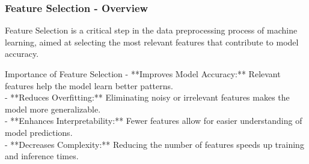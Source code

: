 \documentclass[aspectratio=169]{beamer}
\begin{document}
\begin{frame}[fragile]
    \frametitle{Feature Selection - Overview}
    Feature Selection is a critical step in the data preprocessing process of machine learning, aimed at selecting the most relevant features that contribute to model accuracy.
    
    \begin{block}{Importance of Feature Selection}
        - **Improves Model Accuracy:** Relevant features help the model learn better patterns. \\
        - **Reduces Overfitting:** Eliminating noisy or irrelevant features makes the model more generalizable. \\
        - **Enhances Interpretability:** Fewer features allow for easier understanding of model predictions. \\
        - **Decreases Complexity:** Reducing the number of features speeds up training and inference times.
    \end{block}
\end{frame}
\end{document}

